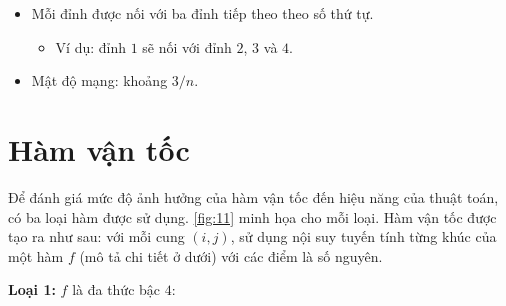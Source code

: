 \documentclass[../main.tex]{subfiles}
\begin{document}
  \begin{itemize}
    \tightlist
    \item
      Mỗi đỉnh được nối với ba đỉnh tiếp theo theo số thứ tự.
    
      \begin{itemize}
      \tightlist
      \item
        Ví dụ: đỉnh $1$ sẽ nối với đỉnh $2$, $3$ và $4$.
      \end{itemize}
    \item
      Mật độ mạng: khoảng \(3/n\).
    \end{itemize}













\section{Hàm vận tốc}\label{huxe0m-thux1eddi-gian}

Để đánh giá mức độ ảnh hưởng của hàm vận tốc đến hiệu năng
của thuật toán, có ba loại hàm được sử dụng. \autoref{fig:11} minh họa cho mỗi
loại. Hàm vận tốc được tạo ra như sau: với mỗi cung
\((i,j)\), sử dụng nội suy tuyến tính từng khúc của một hàm \(f\) (mô tả
chi tiết ở dưới) với các điểm là số nguyên.

\textbf{Loại 1:} \(f\) là đa thức bậc $4$:
\end{document}
